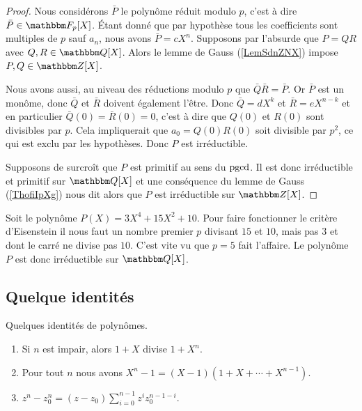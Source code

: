 \begin{proof}
    Nous considérons \( \bar P\) le polynôme réduit modulo \( p\), c'est à dire \( \bar P\in \eF_p[X]\). Étant donné que par hypothèse tous les coefficients sont multiples de \( p\) sauf \( a_n\), nous avons \( \bar P=cX^n\). Supposons par l'absurde que \( P=QR\) avec \( Q,R\in \eQ[X]\). Alors le lemme de Gauss (\ref{LemSdnZNX}) impose \( P,Q\in \eZ[X]\).

    Nous avons aussi, au niveau des réductions modulo \( p\) que $\bar Q\bar R=\bar P$. Or \( \bar P\) est un monôme, donc \( \bar Q\) et \( \bar R\) doivent également l'être. Donc \( \bar Q=dX^k\) et \( \bar R=eX^{n-k}\) et en particulier \( \bar Q(0)=\bar R(0)=0\), c'est à dire que \( Q(0)\) et \( R(0)\) sont divisibles par \( p\). Cela impliquerait que \( a_0=Q(0)R(0)\) soit divisible par \( p^2\), ce qui est exclu par les hypothèses. Donc \( P\) est irréductible.

    Supposons de surcroît que \( P\) est primitif au sens du \( \operatorname{pgcd}\). Il est donc irréductible et primitif sur \( \eQ[X]\) et une conséquence du lemme de Gauss (\ref{ThofiIpXg}) nous dit alors que \( P\) est irréductible sur \( \eZ[X]\).
\end{proof}

\begin{example}
    Soit le polynôme \( P(X)=3X^4+15 X^2+10\). Pour faire fonctionner le critère d'Eisenstein il nous faut un nombre premier \( p\) divisant \( 15\) et \( 10\), mais pas \( 3\) et dont le carré ne divise pas \( 10\). C'est vite vu que \( p=5\) fait l'affaire. Le polynôme \( P\) est donc irréductible sur \( \eQ[X]\).
\end{example}

\subsection{Quelque identités}

\begin{lemma}   \label{LemISPooHIKJBU}
    Quelques identités de polynômes.
    \begin{enumerate}
        \item   \label{ItemLTBooAcyMtN}
            Si \( n\) est impair, alors \( 1+X\) divise \( 1+X^n\).
        \item\label{ItemLTBooAcyMtNii}
            Pour tout \( n\) nous avons \( X^n-1=(X-1)(1+X+\cdots +X^{n-1})\).
        \item
            \( z^n-z_0^n=(z-z_0)\sum_{i=0}^{n-1}z^iz_{0}^{n-1-i}\).
    \end{enumerate}
\end{lemma}

